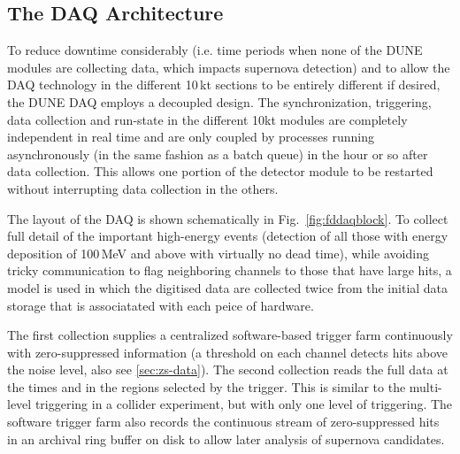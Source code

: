 \subsection{The DAQ Architecture}

To reduce downtime considerably (i.e. time periods when none of the DUNE modules are collecting data, which impacts supernova detection)
and to allow the DAQ technology in the different 10\,kt sections to be entirely different if desired, the DUNE DAQ employs a decoupled 
design. The synchronization, triggering, data collection and run-state in the different 10kt modules are completely independent in real time and
are only coupled by processes running asynchronously (in the same fashion as a batch queue) in the hour or so after data collection.
This allows one portion of the detector module to be restarted without interrupting
data collection in the others.

The layout of the DAQ is shown schematically in Fig.~\ref{fig:fddaqblock}.  To collect full detail of the
important high-energy events (detection of all those with energy deposition of 100\,MeV and above with virtually no dead time),
while avoiding tricky communication to flag neighboring channels to those that have large hits, a model is used
in which the digitised data are collected twice from the initial data
storage that is associatated with each peice of hardware. 


The first collection supplies a centralized software-based trigger farm continuously with
zero-suppressed information (a threshold on each channel detects hits above the noise level, also see \ref{sec:zs-data}).  
The second collection reads the full data at the times and in the regions %
selected by the trigger. This is similar to the multi-level triggering in a collider experiment,
but with only one level of triggering. The software trigger farm also
records the continuous stream of zero-suppressed hits in an archival
ring buffer on disk to allow later analysis of supernova candidates.

